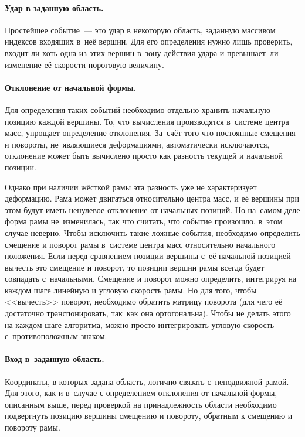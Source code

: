 \documentclass[a4paper, 14pt, titlepage]{extarticle}
\begin{document}
        \paragraph{Удар в заданную область.}
        Простейшее событие~--- это удар в некоторую область, заданную массивом индексов
        входящих в~неё вершин. Для его определения нужно лишь проверить, входит ли хоть одна из этих
        вершин в~зону действия удара и превышает~ли изменение её скорости пороговую величину.

        \paragraph{Отклонение от начальной формы.}
        Для определения таких событий необходимо отдельно хранить начальную позицию каждой вершины.
        То, что вычисления производятся в~системе центра масс, упрощает определение
        отклонения. За~счёт того что постоянные смещения и повороты, не~являющиеся деформациями,
        автоматически исключаются, отклонение может быть вычислено просто как разность текущей и
        начальной позиции.

        Однако при наличии жёсткой рамы эта разность уже не характеризует деформацию. Рама может
        двигаться относительно центра масс, и её вершины при этом будут иметь ненулевое отклонение
        от начальных позиций. Но на~самом деле форма рамы не~изменилась, так что считать, что событие
        произошло, в~этом случае неверно. Чтобы исключить такие ложные события, необходимо определить смещение и поворот
        рамы в~системе центра масс относительно начального положения. Если перед сравнением позиции
        вершины с~её начальной позицией вычесть это смещение и поворот, то позиции вершин рамы
        всегда будет совпадать с~начальными. Смещение и поворот можно определить, интегрируя на
        каждом шаге линейную и угловую скорость рамы. Но для того, чтобы <<вычесть>> поворот,
        необходимо обратить матрицу поворота (для чего её достаточно транспонировать, так~как она
        ортогональна). Чтобы не делать этого на каждом шаге алгоритма, можно просто интегрировать угловую
        скорость с~противоположным знаком.

        \paragraph{Вход в~заданную область.}
        Координаты, в которых задана область, логично связать с~неподвижной рамой. Для этого, как и
        в~случае с определением отклонения от начальной формы, описанным выше, перед проверкой на принадлежность
        области необходимо подвергнуть позицию вершины смещению и повороту, обратным к смещению и
        повороту рамы.
\end{document}
